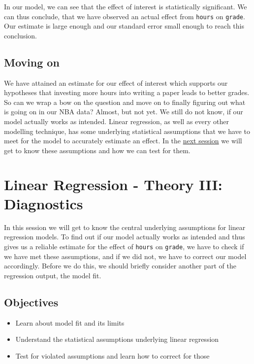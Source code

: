 \documentclass[
]{book}
\providecommand{\tightlist}{%
  \setlength{\itemsep}{0pt}\setlength{\parskip}{0pt}}
\begin{document}
In our model, we can see that the effect of interest is statistically
significant. We can thus conclude, that we have observed an actual effect
from \texttt{hours} on \texttt{grade}. Our estimate is large enough and our standard error
small enough to reach this conclusion.

\hypertarget{moving-on-2}{%
\section{Moving on}\label{moving-on-2}}

We have attained an estimate for our effect of interest which supports our
hypotheses that investing more hours into writing a paper leads to better grades.
So can we wrap a bow on the question and move on to finally figuring out what
is going on in our NBA data? Almost, but not yet. We still do not know, if our
model actually works as intended. Linear regression, as well as every other modelling
technique, has some underlying statistical assumptions that we have to meet for the model
to accurately estimate an effect. In the \protect\hyperlink{lin-t-3}{next session} we will get to know these
assumptions and how we can test for them.

\hypertarget{lin-t-3}{%
\chapter{Linear Regression - Theory III: Diagnostics}\label{lin-t-3}}

In this session we will get to know the central underlying assumptions for linear regression models. To find out if our model actually works as intended and thus gives us a reliable estimate for the effect of \texttt{hours} on \texttt{grade}, we have to check if we have met these assumptions, and if we did not, we have to correct our model accordingly. Before we do this, we should briefly consider another part of the regression output, the model fit.

\hypertarget{objectives-4}{%
\section{Objectives}\label{objectives-4}}

\begin{itemize}
\tightlist
\item
  Learn about model fit and its limits
\item
  Understand the statistical assumptions underlying linear regression
\item
  Test for violated assumptions and learn how to correct for those
\end{itemize}
\end{document}
